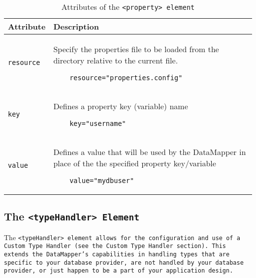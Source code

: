 \begin{table}[!hpt]
\caption{Attributes of the \tt{<property>} element} \label{table:4.3}
\centering
\begin{tabular}{|l|l|}
 \hline
 \textbf{Attribute} & \textbf{Description} \\
 \hline
 \tt{resource} &
 \begin{minipage}{0.7\textwidth}\vspace{2mm}
    Specify the properties file to be loaded from the directory relative to
    the current file.
    \vspace{-3mm}\begin{verbatim}
    resource="properties.config"
    \end{verbatim}\vspace{-5mm}
  \end{minipage}
  \\
  \hline
%
 \tt{key} &
  \begin{minipage}{0.7\textwidth}\vspace{2mm}
   Defines a property key (variable) name
    \vspace{-3mm}\begin{verbatim}
    key="username"
    \end{verbatim}\vspace{-5mm}
  \end{minipage}
  \\
  \hline
%
 \tt{value} &
  \begin{minipage}{0.7\textwidth}\vspace{2mm}
   Defines a value that will be used by the DataMapper in place of the
   the specified property key/variable
    \vspace{-3mm}\begin{verbatim}
    value="mydbuser"
    \end{verbatim}\vspace{-5mm}
  \end{minipage}
  \\
  \hline
\end{tabular}
\end{table}

\subsection{The \tt{<typeHandler>} Element}
The \tt{<typeHandler>} element allows for the configuration and use of a
Custom Type Handler (see the Custom Type Handler section). This extends the
DataMapper's capabilities in handling types that are specific to your database
provider, are not handled by your database provider, or just happen to be a
part of your application design.

